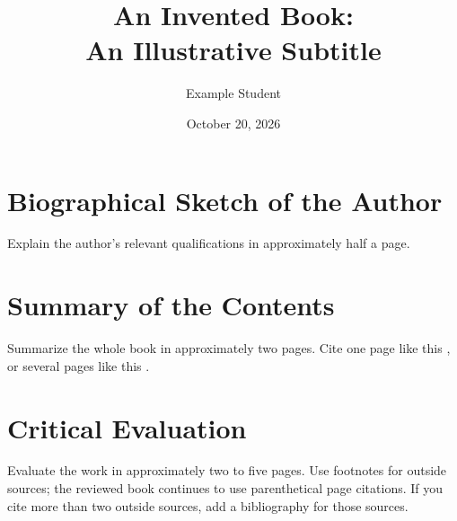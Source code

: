 \documentclass[review,font=termes]{mbts}
\title{An Invented Book:\\An Illustrative Subtitle}
\author{Example Student}
\date{October 20, 2026}
\begin{document}
\maketitle
{}
\section{Biographical Sketch of the Author}
Explain the author's relevant qualifications in approximately half a page.
\section{Summary of the Contents}
Summarize the whole book in approximately two pages. Cite one page like this
, or several pages like this .
\section{Critical Evaluation}
Evaluate the work in approximately two to five pages. Use footnotes for outside
sources; the reviewed book continues to use parenthetical page citations.
If you cite more than two outside sources, add a bibliography for those sources.
\end{document}
